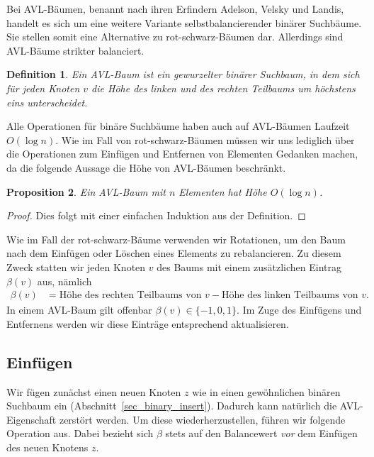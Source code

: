 \documentclass[10pt,reqno]{amsart}
\numberwithin{equation}{section}
\newtheorem{definition}{Definition}[section]
\newtheorem{proposition}[definition]{Proposition}
\begin{document}
\noindent
Bei AVL-B\"aumen, benannt nach ihren Erfindern Adelson, Velsky und Landis, handelt es sich um eine weitere Variante selbstbalancierender bin\"arer Suchb\"aume.
Sie stellen somit eine Alternative zu rot-schwarz-B\"aumen dar.
Allerdings sind AVL-B\"aume strikter balanciert.

\begin{definition}\label{def_avl}
	Ein AVL-Baum ist ein gewurzelter bin\"arer Suchbaum, in dem sich f\"ur jeden Knoten $v$ die H\"ohe des linken und des rechten Teilbaums um h\"ochstens eins unterscheidet.
\end{definition}

Alle Operationen f\"ur bin\"are Suchb\"aume haben auch auf AVL-B\"aumen Laufzeit $O(\log n)$.
Wie im Fall von rot-schwarz-B\"aumen m\"ussen wir uns lediglich \"uber die Operationen zum Einf\"ugen und Entfernen von Elementen Gedanken machen, da die folgende Aussage die H\"ohe von AVL-B\"aumen beschr\"ankt.

\begin{proposition}\label{prop_avl}
	Ein AVL-Baum mit $n$ Elementen hat H\"ohe $O(\log n)$.
\end{proposition}
\begin{proof}
	Dies folgt mit einer einfachen Induktion aus der Definition.
\end{proof}

Wie im Fall der rot-schwarz-B\"aume verwenden wir Rotationen, um den Baum nach dem Einf\"ugen oder L\"oschen eines Elements zu rebalancieren.
Zu diesem Zweck statten wir jeden Knoten $v$ des Baums mit einem zus\"atzlichen Eintrag $\beta(v)$ aus, n\"amlich
\begin{align*}
	\beta(v)&=\mbox{H\"ohe des rechten Teilbaums von $v$}-\mbox{H\"ohe des linken Teilbaums von $v$}.
\end{align*}
In einem AVL-Baum gilt offenbar $\beta(v)\in\{-1,0,1\}$.
Im Zuge des Einf\"ugens und Entfernens werden wir diese Eintr\"age entsprechend aktualisieren.

\subsection{Einf\"ugen}\label{sec_avl_insert}
Wir f\"ugen zun\"achst einen neuen Knoten $z$ wie in einen gew\"ohnlichen bin\"aren Suchbaum ein (Abschnitt~\ref{sec_binary_insert}).
Dadurch kann nat\"urlich die AVL-Eigenschaft zerst\"ort werden.
Um diese wiederherzustellen, f\"uhren wir folgende Operation aus.
Dabei bezieht sich $\beta$ stets auf den Balancewert {\em vor} dem Einf\"ugen des neuen Knotens $z$.
\end{document}
